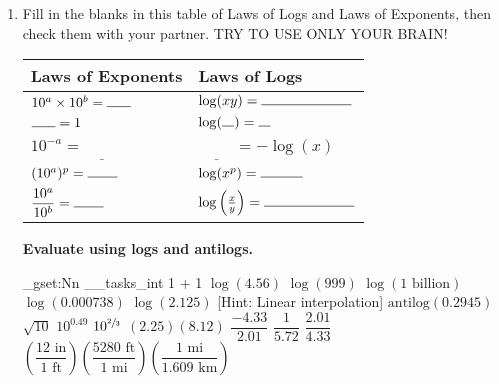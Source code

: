 \documentclass[12pt,letterpaper]{article}
\newcommand{\SetProbNumber}[1]{
  \int_gset:Nn \g__tasks_int {#1 + 1}
}
\begin{document}
\begin{enumerate}

\item Fill in the blanks in this table of Laws of Logs and Laws of Exponents, then check them with your partner. TRY TO USE ONLY YOUR BRAIN!

\begin{center}
\def\arraystretch{1.5}
\begin{tabular}{ll}
Laws of Exponents & Laws of Logs \\
\hline
$10^a \times 10^b = \rule{4ex}{0.15mm}$ & $\log(xy) = \rule{15ex}{0.15mm}$ \\
$\rule{4ex}{0.15mm}=1$ & $\log(\rule{2ex}{0.15mm})=\rule{2ex}{0.15mm}$ \\
$10^{-a}=\underline{\phantom{\frac{1}{10^a}\frac{1}{10^a}}}$ 
& $\underline{\phantom{\frac{1}{10^a}\frac{1}{10^a}}}=-\log(x)$ \\
$(10^a)^p=\rule{5ex}{0.15mm}$ & $\log(x^p) = \rule{7ex}{0.15mm}$ \\
$\dfrac{10^a}{10^b} = \rule{5ex}{0.15mm}$ & $\log\left (\frac{x}{y}\right ) = \rule{15ex}{0.15mm}$
\end{tabular}
\end{center}

\hspace*{-1.25em}\textbf{Evaluate using logs and antilogs.}
\begin{problems}
\problem\SetProbNumber{1} $\log(4.56)$
\problem $\log(999)$
\problem $\log(\text{1 billion})$
\problem $\log(0.000738)$ 
\problem $\log(2.125)$ [Hint: Linear interpolation]
\problem $\text{antilog}(0.2945)$
\problem $\sqrt{10}$
\problem $10^{0.49}$
\problem $10^{\sfrac{2}{3}}$
\problem $(2.25)(8.12)$
\problem $\dfrac{-4.33}{2.01}$
\problem $\dfrac{1}{5.72}$
\problem $\dfrac{2.01}{4.33}$
\problem $\left (\dfrac{12 \text{ in}}{1 \text{ ft}} \right )\left (\dfrac{5280 \text{ ft}}{1 \text{ mi}}\right ) \left (\dfrac{1 \text{ mi}}{1.609 \text{ km}}\right )$
\end{problems}

\end{enumerate}
\end{document}
